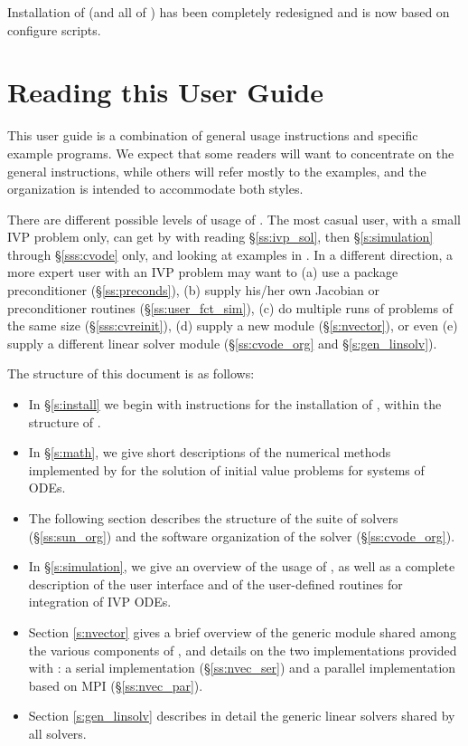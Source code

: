 Installation of {\cvode} (and all of {\sundials}) has been completely 
redesigned and is now based on configure scripts.

\section{Reading this User Guide}\label{ss:reading}

This user guide is a combination of general usage instructions and
specific example programs.  We expect that some readers will want to
concentrate on the general instructions, while others will refer
mostly to the examples, and the organization is intended to
accommodate both styles.

There are different possible levels of usage of {\cvode}. The most casual
user, with a small IVP problem only, can get by with reading \S\ref{ss:ivp_sol}, 
then \S\ref{s:simulation} through \S\ref{sss:cvode} only, and looking at examples 
in \cite{cvode2.1_ex}. 
In a different direction, a more expert user with an IVP problem may want
to (a) use a package preconditioner (\S\ref{ss:preconds}), (b) supply
his/her own Jacobian or preconditioner routines (\S\ref{ss:user_fct_sim}),
(c) do multiple runs of problems of the same size (\S\ref{sss:cvreinit}), 
(d) supply a new {\nvector} module (\S\ref{s:nvector}), or even 
(e) supply a different linear solver module
(\S\ref{ss:cvode_org} and \S\ref{s:gen_linsolv}).

The structure of this document is as follows:
\begin{itemize}
\item
  In \S\ref{s:install} we begin with instructions for the installation of 
  {\cvode}, within the structure of {\sundials}.
\item
  In \S\ref{s:math}, we give short descriptions of the numerical 
  methods implemented by {\cvode} for the solution of initial value problems
  for systems of ODEs.
\item
  The following section describes the structure of the {\sundials} suite
  of solvers (\S\ref{ss:sun_org}) and the software organization of the {\cvode}
  solver (\S\ref{ss:cvode_org}). 
\item
  In \S\ref{s:simulation}, we give an overview of the usage of {\cvode},
  as well as a complete description of the user interface and of the 
  user-defined routines for integration of IVP ODEs.
\item
  Section \ref{s:nvector} gives a brief overview of the generic {\nvector} module 
  shared among the various components of {\sundials}, and details on the two {\nvector}
  implementations provided with {\sundials}: a serial implementation
  (\S\ref{ss:nvec_ser}) and a parallel implementation based on MPI
  (\S\ref{ss:nvec_par}).
\item
  Section \ref{s:gen_linsolv} describes in detail the generic linear solvers shared 
  by all {\sundials} solvers.
\end{itemize}


